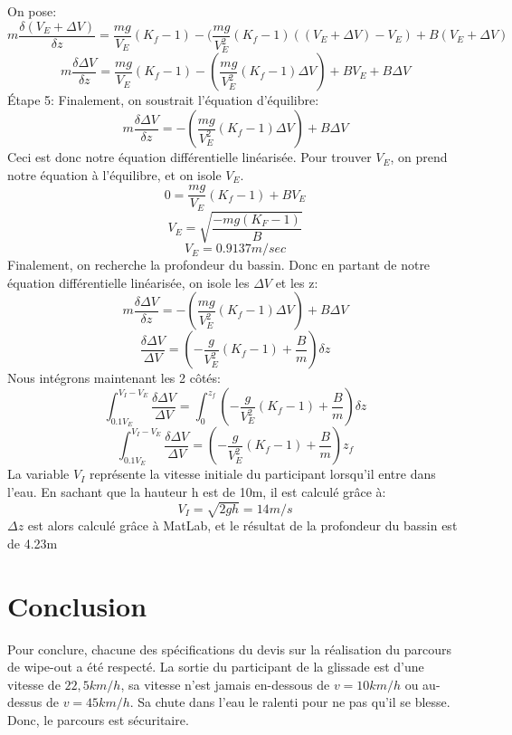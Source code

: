\documentclass[12pt]{article}
\begin{document}
On pose: 
\begin{equation}
m\frac{\delta (V_E + \Delta V)}{\delta z} = \frac{mg}{V_E}(K_f-1) - (\frac{mg}{V_E^2}(K_f-1)((V_E + \Delta V)-V_E)+B(V_E + \Delta V)
\end{equation}
\begin{equation}
m\frac{\delta \Delta V}{\delta z} = \frac{mg}{V_E}(K_f-1) - (\frac{mg}{V_E^2}(K_f-1) \Delta V)+BV_E + B\Delta V
\end{equation}
Étape 5: Finalement, on soustrait l'équation d'équilibre:
\begin{equation}
m\frac{\delta \Delta V}{\delta z} = - (\frac{mg}{V_E^2}(K_f-1) \Delta V)+ B\Delta V
\end{equation}
Ceci est donc notre équation différentielle linéarisée.
\newline
\newline
Pour trouver $V_E$, on prend notre équation à l'équilibre, et on isole $V_E$.
\begin{equation}
0 = \frac{mg}{V_E}(K_f-1)+BV_E
\end{equation}
\begin{equation}
V_E = \sqrt{\frac{-mg(K_F-1)}{B}}
\end{equation} 
\begin{equation}
V_E = 0.9137m/sec
\end{equation}  
Finalement, on recherche la profondeur du bassin. Donc en partant de notre équation différentielle linéarisée, on isole les $\Delta V$ et les z: 
\begin{equation}
m\frac{\delta \Delta V}{\delta z} = - (\frac{mg}{V_E^2}(K_f-1) \Delta V)+ B\Delta V
\end{equation}
\begin{equation}
\frac{\delta \Delta V}{\Delta V} =  (-\frac{g}{V_E^2}(K_f-1)+ \frac{B}{m})\delta z
\end{equation}
Nous intégrons maintenant les 2 côtés:
\begin{equation}
\int_{0.1V_E}^{V_I-V_E}\frac{\delta \Delta V}{\Delta V} = \int_{0}^{z_f} (-\frac{g}{V_E^2}(K_f-1)+ \frac{B}{m})\delta z
\end{equation}
\begin{equation}
\int_{0.1V_E}^{V_I-V_E}\frac{\delta \Delta V}{\Delta V} = (-\frac{g}{V_E^2}(K_f-1)+ \frac{B}{m})z_f
\end{equation}
La variable $V_I$ représente la vitesse initiale du participant lorsqu'il entre dans l'eau. En sachant que la hauteur h est de 10m, il est calculé grâce à:
\begin{equation}
V_I = \sqrt{2gh}=14 m/s
\end{equation}
$\Delta z$ est alors calculé grâce à MatLab, et le résultat de la profondeur du bassin est de 4.23m
\section{Conclusion}
Pour conclure, chacune des spécifications du devis sur la réalisation du parcours de wipe-out a été respecté. La sortie du participant de la glissade est d'une vitesse de $22,5km/h$, sa vitesse n'est jamais en-dessous de $v=10km/h$ ou au-dessus de $v=45km/h$. Sa chute dans l'eau le ralenti pour ne pas qu'il se blesse. Donc, le parcours est sécuritaire.
\end{document}

